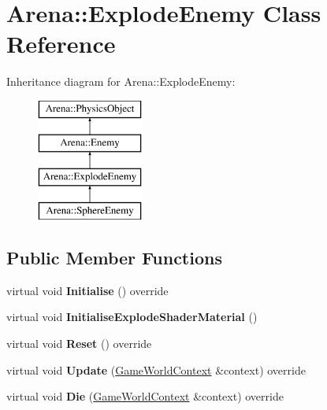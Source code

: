 \hypertarget{class_arena_1_1_explode_enemy}{\section{Arena\+:\+:Explode\+Enemy Class Reference}
\label{class_arena_1_1_explode_enemy}
}
Inheritance diagram for Arena\+:\+:Explode\+Enemy\+:\begin{figure}[H]
\begin{center}
\leavevmode
\includegraphics[height=4.000000cm]{class_arena_1_1_explode_enemy}
\end{center}
\end{figure}
\subsection*{Public Member Functions}
\begin{DoxyCompactItemize}
\item 
\hypertarget{class_arena_1_1_explode_enemy_a90e128d35bc1c66edc72b0b0d10522a2}{virtual void {\bfseries Initialise} () override}\label{class_arena_1_1_explode_enemy_a90e128d35bc1c66edc72b0b0d10522a2}

\item 
\hypertarget{class_arena_1_1_explode_enemy_abcacf02e655151ae4dcccad1bd60ece7}{virtual void {\bfseries Initialise\+Explode\+Shader\+Material} ()}\label{class_arena_1_1_explode_enemy_abcacf02e655151ae4dcccad1bd60ece7}

\item 
\hypertarget{class_arena_1_1_explode_enemy_a5f6f050d75e1ab9cbe555c748d2576b5}{virtual void {\bfseries Reset} () override}\label{class_arena_1_1_explode_enemy_a5f6f050d75e1ab9cbe555c748d2576b5}

\item 
\hypertarget{class_arena_1_1_explode_enemy_a5176b5c914dd2f40d731095cc92f21a6}{virtual void {\bfseries Update} (\hyperlink{struct_arena_1_1_game_world_context}{Game\+World\+Context} \&context) override}\label{class_arena_1_1_explode_enemy_a5176b5c914dd2f40d731095cc92f21a6}

\item 
\hypertarget{class_arena_1_1_explode_enemy_ab4a86a86648a4aa3f2202a6a99b4e073}{virtual void {\bfseries Die} (\hyperlink{struct_arena_1_1_game_world_context}{Game\+World\+Context} \&context) override}\label{class_arena_1_1_explode_enemy_ab4a86a86648a4aa3f2202a6a99b4e073}

\end{DoxyCompactItemize}
